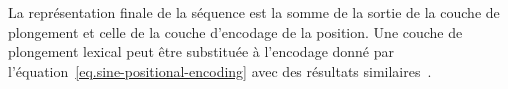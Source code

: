 La représentation finale de la séquence est la somme de la sortie de la couche de plongement 
et celle de la couche d'encodage de la position.
Une couche de plongement lexical peut être substituée à l'encodage donné par
l'équation~\eqref{eq.sine-positional-encoding} avec des résultats similaires~\cite{attention}.

